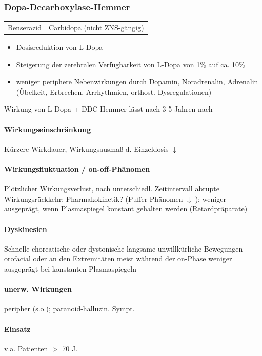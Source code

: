 \documentclass[10pt,a4paper]{report}
\begin{document}
\subsubsection{Dopa-Decarboxylase-Hemmer} %
\label{ssub:dopa_decarboxylase_hemmer}
\begin{tabularx}{\textwidth}{XX}
Benserazid&Carbidopa (nicht ZNS-gängig)\\
\end{tabularx}
\begin{itemize}
	\item Dosisreduktion von L-Dopa
	\item Steigerung der zerebralen Verfügbarkeit von L-Dopa von 1\% auf ca. 10\%
	\item weniger periphere Nebenwirkungen durch Dopamin, Noradrenalin, Adrenalin (Übelkeit, Erbrechen, Arrhythmien, orthost. Dysregulationen)
\end{itemize}
Wirkung von L-Dopa + DDC-Hemmer lässt nach 3-5 Jahren nach
\paragraph{Wirkungseinschränkung} %
\label{par:paragraph_name}
Kürzere Wirkdauer, Wirkungsausmaß d. Einzeldosis $\downarrow$  
\paragraph{Wirkungsfluktuation / on-off-Phänomen} %
\label{par:paragraph_name}

Plötzlicher Wirkungsverlust, nach unterschiedl. Zeitintervall abrupte Wirkungsrückkehr; Pharmakokinetik? (Puffer-Phänomen $\downarrow$ ); weniger ausgeprägt, wenn Plasmaspiegel konstant gehalten werden (Retardpräparate)
\paragraph{Dyskinesien} %
\label{par:paragraph_name}
Schnelle choreatische oder dystonische langsame unwillkürliche Bewegungen orofacial oder an den Extremitäten meist während der on-Phase weniger ausgeprägt bei konstanten Plasmaspiegeln
\paragraph{unerw. Wirkungen} %
\label{par:paragraph_name}
peripher (s.o.); paranoid-halluzin. Sympt.
\paragraph{Einsatz} %
\label{par:einsatz}
v.a. Patienten $>$ 70 J.
\end{document}
